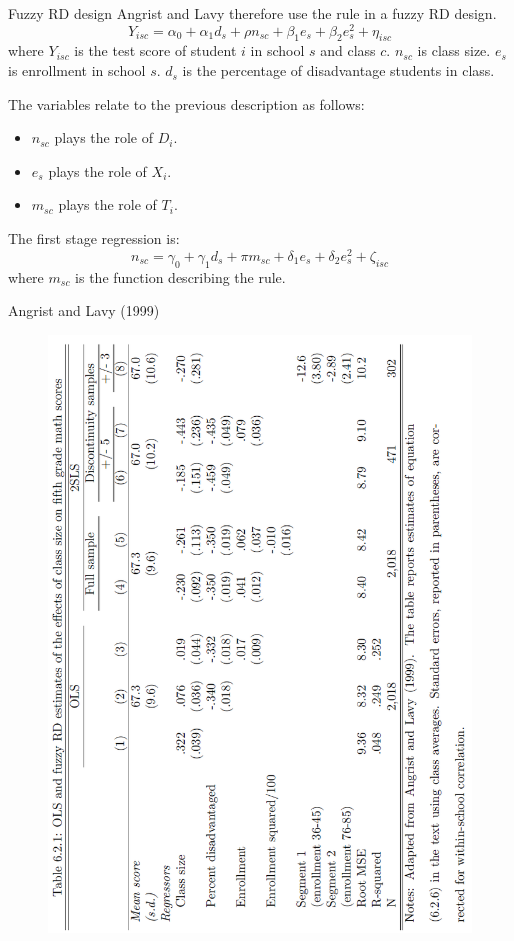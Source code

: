 \documentclass[handout]{beamer}
\begin{document}
\begin{frame}{Fuzzy RD design}
Angrist and Lavy therefore use the rule in a fuzzy RD design.
\[ Y_{isc} = \alpha_0 + \alpha_1d_s + \rho n_{sc} + \beta_1e_s + \beta_2e^2_s + \eta_{isc} \]
where $Y_{isc}$ is the test score of student $i$ in school $s$ and class $c$. $n_{sc}$ is class size. $e_s$ is enrollment in school $s$. $d_s$ is the percentage of disadvantage students in class.\medskip

The variables relate to the previous description as follows:
\begin{itemize}
	\item $n_{sc}$ plays the role of $D_i$.
	\item $e_s$ plays the role of $X_i$.
	\item $m_{sc}$ plays the role of $T_i$.
\end{itemize}
The first stage regression is:
\[n_{sc} = \gamma_0 + \gamma_1 d_s + \pi m_{sc} + \delta_1e_s + \delta_2e^2_s + \zeta_{isc}\]
where $m_{sc}$ is the function describing the rule.
\end{frame}

\begin{frame}{Angrist and Lavy (1999)}
\begin{figure}
	\centering
	\includegraphics[angle=270,width=.85\linewidth]{./Figures/angristlavy1}
\end{figure}

\end{frame}
\end{document}
